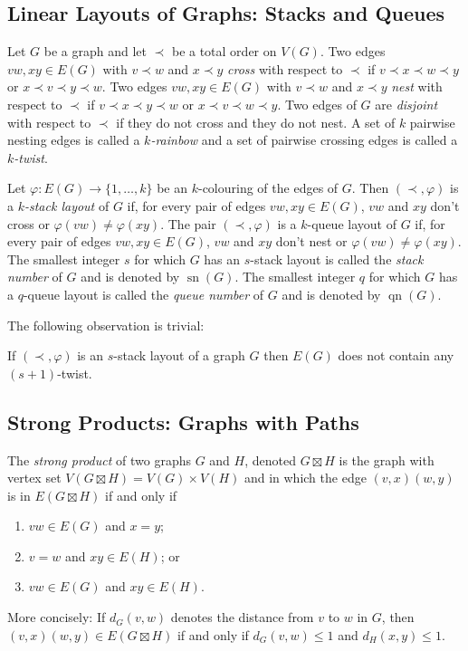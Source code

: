\documentclass[kpfonts]{patmorin}
\DeclareMathOperator{\sn}{sn}
\DeclareMathOperator{\qn}{qn}
\begin{document}
\subsection{Linear Layouts of Graphs: Stacks and Queues}

Let $G$ be a graph and let $\prec$ be a total order on $V(G)$.  Two edges $vw,xy\in E(G)$ with $v\prec w$ and $x\prec y$ \emph{cross} with respect to $\prec$ if $v\prec x\prec w\prec y$ or $x\prec v\prec y\prec w$. Two edges $vw,xy\in E(G)$ with $v\prec w$ and $x\prec y$ \emph{nest} with respect to $\prec$ if $v\prec x\prec y\prec w$ or $x\prec v\prec w\prec y$.  Two edges of $G$ are \emph{disjoint} with respect to $\prec$ if they do not cross and they do not nest. A set of $k$ pairwise nesting edges is called a \emph{$k$-rainbow} and a set of pairwise crossing edges is called a \emph{$k$-twist}.

Let $\varphi:E(G)\to\{1,\ldots,k\}$ be an $k$-colouring of the edges of $G$.  Then $(\prec,\varphi)$ is a \emph{$k$-stack layout} of $G$ if, for every pair of edges $vw,xy\in E(G)$, $vw$ and $xy$ don't cross or $\varphi(vw)\neq\varphi(xy)$. The pair $(\prec,\varphi)$ is a $k$-queue layout of $G$ if, for every pair of edges $vw,xy\in E(G)$, $vw$ and $xy$ don't nest or $\varphi(vw)\neq\varphi(xy)$.  The smallest integer $s$ for which $G$ has an $s$-stack layout is called the \emph{stack number} of $G$ and is denoted by $\sn(G)$.  The smallest integer $q$ for which $G$ has a $q$-queue layout is called the \emph{queue number} of $G$ and is denoted by $\qn(G)$.  

The following observation is trivial:

\begin{obs}
  If $(\prec,\varphi)$ is an $s$-stack layout of a graph $G$ then $E(G)$ does not contain any $(s+1)$-twist.
\end{obs}


\subsection{Strong Products: Graphs with Paths}

The \emph{strong product} of two graphs $G$ and $H$, denoted $G\boxtimes H$ is the graph with vertex set $V(G\boxtimes H)=V(G)\times V(H)$ and in which the edge $(v,x)(w,y)$ is in $E(G\boxtimes H)$ if and only if
\begin{enumerate}
  \item $vw\in E(G)$ and $x=y$;
  \item $v=w$ and $xy\in E(H)$; or
  \item $vw\in E(G)$ and $xy\in E(H)$.
\end{enumerate}
More concisely: If $d_G(v,w)$ denotes the distance from $v$ to $w$ in $G$, then $(v,x)(w,y)\in E(G\boxtimes H)$ if and only if $d_G(v,w)\le 1$ and $d_H(x,y)\le 1$.
\end{document}
